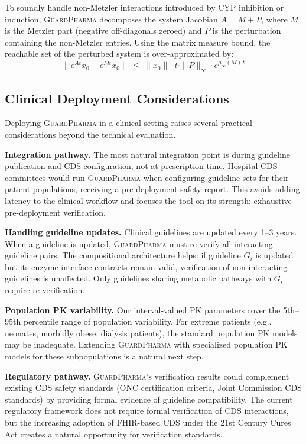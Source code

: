 \documentclass{article}
\theoremstyle{definition}
\begin{document}
To soundly handle non-Metzler interactions introduced by CYP inhibition or induction, \textsc{GuardPharma} decomposes the system Jacobian $A = M + P$, where $M$ is the Metzler part (negative off-diagonals zeroed) and $P$ is the perturbation containing the non-Metzler entries. Using the matrix measure bound, the reachable set of the perturbed system is over-approximated by:
\[
\| e^{At} x_0 - e^{Mt} x_0 \| \;\leq\; \|x_0\| \cdot t \cdot \|P\|_\infty \cdot e^{\mu_\infty(M)\,t}
\]

\subsection{Clinical Deployment Considerations}

Deploying \textsc{GuardPharma} in a clinical setting raises several practical considerations beyond the technical evaluation.

\textbf{Integration pathway.} The most natural integration point is during guideline publication and CDS configuration, not at prescription time. Hospital CDS committees would run \textsc{GuardPharma} when configuring guideline sets for their patient populations, receiving a pre-deployment safety report. This avoids adding latency to the clinical workflow and focuses the tool on its strength: exhaustive pre-deployment verification.

\textbf{Handling guideline updates.} Clinical guidelines are updated every 1--3 years. When a guideline is updated, \textsc{GuardPharma} must re-verify all interacting guideline pairs. The compositional architecture helps: if guideline $G_i$ is updated but its enzyme-interface contracts remain valid, verification of non-interacting guidelines is unaffected. Only guidelines sharing metabolic pathways with $G_i$ require re-verification.

\textbf{Population PK variability.} Our interval-valued PK parameters cover the 5th--95th percentile range of population variability. For extreme patients (e.g., neonates, morbidly obese, dialysis patients), the standard population PK models may be inadequate. Extending \textsc{GuardPharma} with specialized population PK models for these subpopulations is a natural next step.

\textbf{Regulatory pathway.} \textsc{GuardPharma}'s verification results could complement existing CDS safety standards (ONC certification criteria, Joint Commission CDS standards) by providing formal evidence of guideline compatibility. The current regulatory framework does not require formal verification of CDS interactions, but the increasing adoption of FHIR-based CDS under the 21st Century Cures Act creates a natural opportunity for verification standards.
\end{document}
